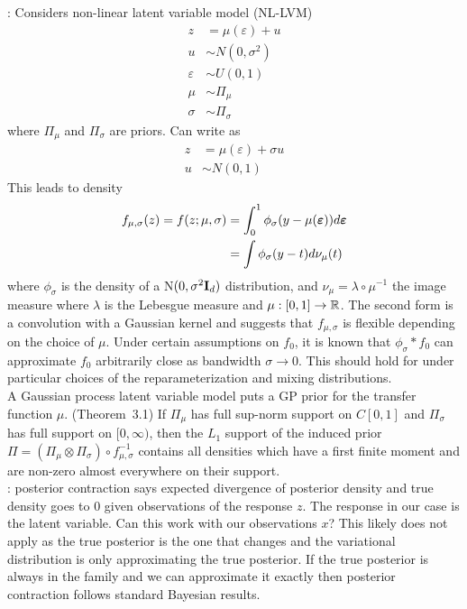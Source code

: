 \documentclass[10pt]{article}
\begin{document}
\todo: Considers non-linear latent variable model (NL-LVM)
\begin{align*}
z &= \mu(\varepsilon) + u \\
u &\sim N(0,\sigma^2) \\
\varepsilon &\sim U(0,1) \\
\mu &\sim \Pi_\mu \\
\sigma &\sim \Pi_\sigma
\end{align*}
where $\Pi_\mu$ and $\Pi_\sigma$ are priors. Can write as
\begin{align*}
z &= \mu(\varepsilon) + \sigma u \\
u &\sim N(0,1)
\end{align*}
This leads to density
\begin{align*}
f_{\mu,\sigma}(z) = f(z;\mu,\sigma) &= \int_0^1\phi_\sigma(y-\mu(\bm{\varepsilon}))d\bm{\varepsilon} \\
&= \int \phi_\sigma(y-t)d\nu_\mu(t)
\end{align*}
where $\phi_\sigma$ is the density of a N$(0,\sigma^2\mathbf{I}_d)$ distribution, and $\nu_\mu=\lambda\circ\mu^{-1}$ the image measure where $\lambda$ is the Lebesgue measure and $\mu:[0,1]\rightarrow\mathbb{R}$. The second form is a convolution with a Gaussian kernel and suggests that $f_{\mu,\sigma}$ is flexible depending on the choice of $\mu$. Under certain assumptions on $f_0$, it is known that $\phi_\sigma*f_0$ can approximate $f_0$ arbitrarily close as bandwidth $\sigma\rightarrow 0$. This should hold for \uivi under particular choices of the reparameterization and mixing distributions.
\\

A Gaussian process latent variable model puts a GP prior for the transfer function $\mu$. (Theorem~3.1) If $\Pi_\mu$ has full sup-norm support on $C[0,1]$ and $\Pi_\sigma$ has full support on $[0,\infty)$, then the $L_1$ support of the induced prior $\Pi=(\Pi_\mu\otimes\Pi_\sigma)\circ f_{\mu,\sigma}^{-1}$ contains all densities which have a first finite moment and are non-zero almost everywhere on their support.
\\

\todo: posterior contraction says expected divergence of posterior density and true density goes to 0 given observations of the response $z$. The response in our case is the latent variable. Can this work with our observations $x$? This likely does not apply as the true posterior is the one that changes and the variational distribution is only approximating the true posterior. If the true posterior is always in the family and we can approximate it exactly then posterior contraction follows standard Bayesian results.
\\
\end{document}
